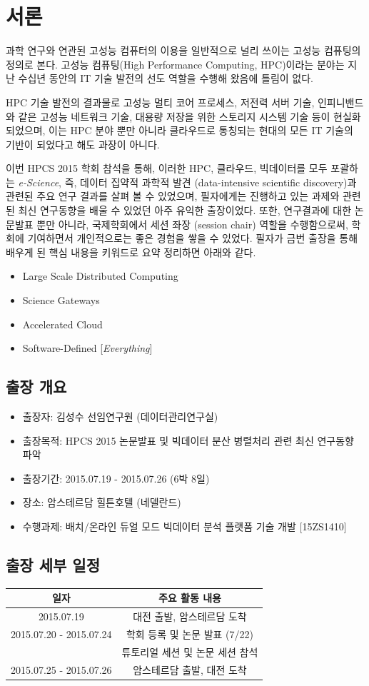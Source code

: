 \documentclass[twocolumn]{article}
\newcommand{\bi}{\begin{itemize}}
\newcommand{\ei}{\end{itemize}}
\newcommand{\ii}{\item}
\begin{document}
\section{서론}
과학 연구와 연관된 고성능 컴퓨터의 이용을 일반적으로 널리 쓰이는 고성능 컴퓨팅의 정의로 본다. 
고성능 컴퓨팅(High Performance Computing, HPC)이라는 분야는 지난 수십년 동안의 IT 기술 발전의 선도 역할을 수행해 왔음에 틀림이 없다. 

HPC 기술 발전의 결과물로 고성능 멀티 코어 프로세스, 저전력 서버 기술, 인피니밴드와 같은 고성능 네트워크 기술, 대용량 저장을 위한 스토리지 시스템 기술 등이 현실화되었으며, 이는 HPC 분야 뿐만 아니라 클라우드로 통칭되는 현대의 모든 IT 기술의 기반이 되었다고 해도 과장이 아니다.

이번 HPCS 2015 학회 \cite{hpcs:2015} 참석을 통해, 이러한 HPC, 클라우드, 빅데이터를 모두 포괄하는\textit{ e-Science}, 즉, 데이터 집약적 과학적 발견 (data-intensive scientific discovery)과 관련된 주요 연구 결과를 살펴 볼 수 있었으며, 필자에게는 진행하고 있는 과제와 관련된 최신 연구동향을 배울 수 있었던 아주 유익한 출장이었다. 
또한, 연구결과에 대한 논문발표 뿐만 아니라, 국제학회에서 세션 좌장 (session chair) 역할을 수행함으로써, 학회에 기여하면서 개인적으로는 좋은 경험을 쌓을 수 있었다.
필자가 금번 출장을 통해 배우게 된 핵심 내용을 키워드로 요약 정리하면 아래와 같다.

\bi
\ii Large Scale Distributed Computing
\ii Science Gateways
\ii Accelerated Cloud
\ii Software-Defined [\textit{Everything}]
\ei
\subsection{출장 개요}

\bi
\ii 출장자: 김성수 선임연구원 (데이터관리연구실)
\ii 출장목적: HPCS 2015 논문발표 및 빅데이터 분산 병렬처리 관련 최신 연구동향 파악
\ii 출장기간: 2015.07.19 - 2015.07.26 (6박 8일)
\ii 장소: 암스테르담 힐튼호텔 (네델란드)
\ii 수행과제: 배치/온라인 듀얼 모드 빅데이터 분석 플랫폼 기술 개발 [15ZS1410]
\ei

\subsection{출장 세부 일정}

\begin{tabular}{ c | c } 
\hline	
\textbf{일자} & \textbf{주요 활동 내용} \\ 
\hline 
\hline
2015.07.19 & 대전 출발, 암스테르담 도착 \\ 
2015.07.20 - 2015.07.24 & 학회 등록 및 논문 발표 (7/22)  \\ 
 					 & 튜토리얼 세션 및 논문 세션 참석 \\ 
2015.07.25 - 2015.07.26 & 암스테르담 출발, 대전 도착 \\
\hline 
\end{tabular}
\end{document}
